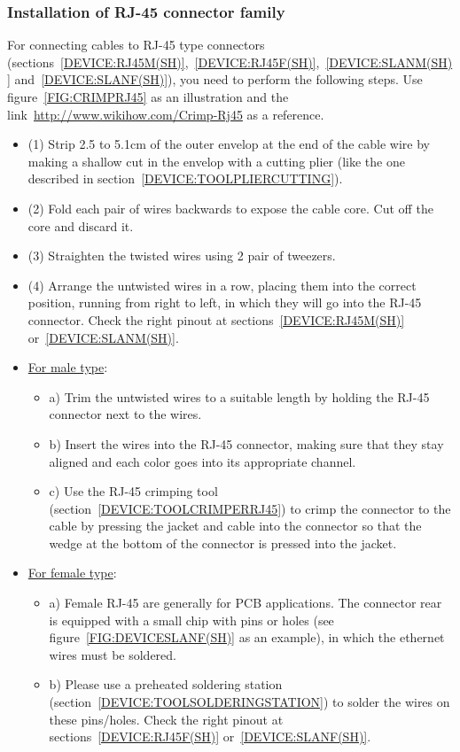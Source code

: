 \subsubsection{Installation of RJ-45 connector family} \label{CRIMPINGRJ45}
For connecting cables to RJ-45 type connectors (sections~\ref{DEVICE:RJ45M(SH)},~\ref{DEVICE:RJ45F(SH)},~\ref{DEVICE:SLANM(SH)} and~\ref{DEVICE:SLANF(SH)}), you need to perform the following steps. Use figure~\ref{FIG:CRIMPRJ45} as an illustration and the link~\href{http://www.wikihow.com/Crimp-Rj45}{http://www.wikihow.com/Crimp-Rj45} as a reference.
  \begin{itemize}
    \item (1) Strip 2.5 to 5.1cm of the outer envelop at the end of the cable wire by making a shallow cut in the envelop with a cutting plier (like the one described in section~\ref{DEVICE:TOOLPLIERCUTTING}).
    \item (2) Fold each pair of wires backwards to expose the cable core. Cut off the core and discard it.
    \item (3) Straighten the twisted wires using 2 pair of tweezers.
    \item (4) Arrange the untwisted wires in a row, placing them into the correct position, running from right to left, in which they will go into the RJ-45 connector. Check the right pinout at sections~\ref{DEVICE:RJ45M(SH)} or~\ref{DEVICE:SLANM(SH)}.
    \item \underline{For male type}:
    \begin{itemize}
      \item a) Trim the untwisted wires to a suitable length by holding the RJ-45 connector next to the wires.
      \item b) Insert the wires into the RJ-45 connector, making sure that they stay aligned and each color goes into its appropriate channel.
      \item c) Use the RJ-45 crimping tool (section~\ref{DEVICE:TOOLCRIMPERRJ45}) to crimp the connector to the cable by pressing the jacket and cable into the connector so that the wedge at the bottom of the connector is pressed into the jacket.
    \end{itemize}
    \item \underline{For female type}:
    \begin{itemize}
      \item a) Female RJ-45 are generally for PCB applications. The connector rear is equipped with a small chip with pins or holes (see figure~\ref{FIG:DEVICESLANF(SH)} as an example), in which the ethernet wires must be soldered.
      \item b) Please use a preheated soldering station (section~\ref{DEVICE:TOOLSOLDERINGSTATION}) to solder the wires on these pins/holes. Check the right pinout at sections~\ref{DEVICE:RJ45F(SH)} or~\ref{DEVICE:SLANF(SH)}.
    \end{itemize}
  \end{itemize}

